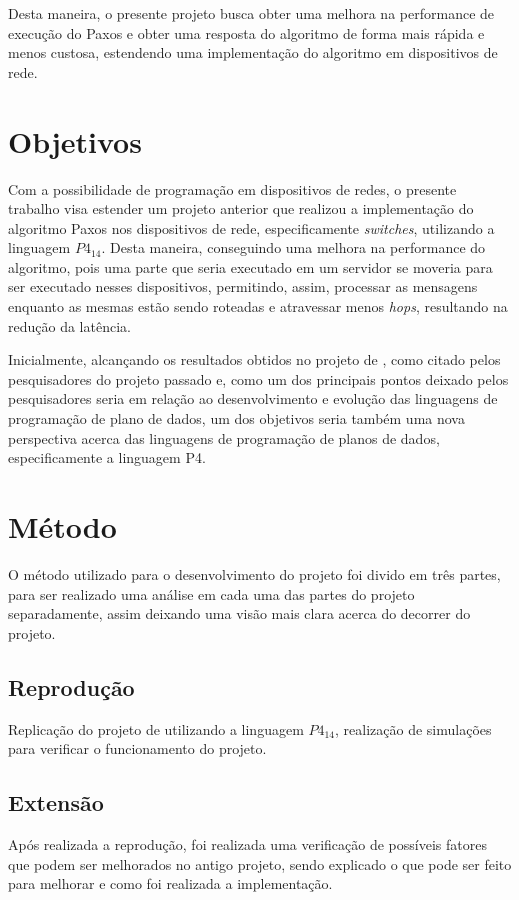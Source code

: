 \documentclass[
    12pt,
    openright, 
    oneside,
    a4paper,
    french,
    english,
    brazil
    ]{facom-ufu-abntex2}
\theoremstyle{definition}
\begin{document}
Desta maneira, o presente projeto busca obter uma melhora na performance de 
execução do Paxos e obter uma resposta do algoritmo de forma mais rápida e menos 
custosa, estendendo uma implementação do algoritmo em dispositivos de rede.

\section{Objetivos}
Com a possibilidade de programação em dispositivos de redes, o presente trabalho 
visa estender um projeto anterior que realizou a implementação do algoritmo Paxos nos 
dispositivos de rede, especificamente \emph{switches}, utilizando a linguagem $P4_{14}$. 
Desta maneira, conseguindo uma melhora na performance do algoritmo, pois uma parte 
que seria executado em um servidor se moveria para ser executado nesses dispositivos, permitindo,
assim, processar as mensagens enquanto as mesmas estão sendo roteadas e atravessar menos
\emph{hops}, resultando na redução da latência.

Inicialmente, alcançando os resultados obtidos no projeto de \cite{dang2016paxos}, 
como citado pelos pesquisadores do projeto passado e, como um dos principais pontos deixado pelos 
pesquisadores seria em relação ao desenvolvimento
e evolução das linguagens de programação de plano de dados, um dos objetivos seria 
também uma nova perspectiva acerca das linguagens de programação de planos de dados, 
especificamente a linguagem P4.

\section{Método}
O método utilizado para o desenvolvimento do projeto foi divido em três partes, para
ser realizado uma análise em cada uma das partes do projeto separadamente, assim deixando uma
visão mais clara acerca do decorrer do projeto.

\subsection{Reprodução}
Replicação do projeto de \cite{dang2016paxos} utilizando a linguagem 
$P4_{14}$, realização de simulações para verificar o funcionamento do projeto.

\subsection{Extensão}
Após realizada a reprodução, foi realizada uma verificação de possíveis fatores que podem ser 
melhorados no antigo projeto, sendo explicado o que pode ser feito para melhorar e como foi
realizada a implementação.
\end{document}
